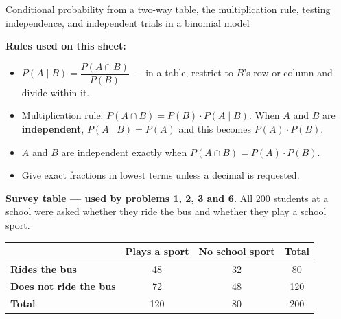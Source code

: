 \documentclass[12pt]{article}
\begin{document}

\noindent\small Conditional probability from a two-way table, the multiplication rule, testing independence, and independent trials in a binomial model

\medskip
\noindent\textbf{Rules used on this sheet:}
\begin{itemize}[leftmargin=1cm, itemsep=1pt, topsep=2pt]
  \item $P(A \mid B) = \dfrac{P(A \cap B)}{P(B)}$ --- in a table, restrict to $B$'s row or column and divide within it.
  \item Multiplication rule: $P(A \cap B) = P(B) \cdot P(A \mid B)$. When $A$ and $B$ are \textbf{independent}, $P(A \mid B) = P(A)$ and this becomes $P(A) \cdot P(B)$.
  \item $A$ and $B$ are independent exactly when $P(A \cap B) = P(A) \cdot P(B)$.
  \item Give exact fractions in lowest terms unless a decimal is requested.
\end{itemize}

\medskip
\noindent\textbf{Survey table --- used by problems 1, 2, 3 and 6.} All 200 students at a
school were asked whether they ride the bus and whether they play a school sport.
\begin{center}
\begin{tabular}{|l|c|c|c|}\hline
 & \textbf{Plays a sport} & \textbf{No school sport} & \textbf{Total} \\\hline
\textbf{Rides the bus} & 48 & 32 & 80 \\\hline
\textbf{Does not ride the bus} & 72 & 48 & 120 \\\hline
\textbf{Total} & 120 & 80 & 200 \\\hline
\end{tabular}
\end{center}
\normalsize


\end{document}
